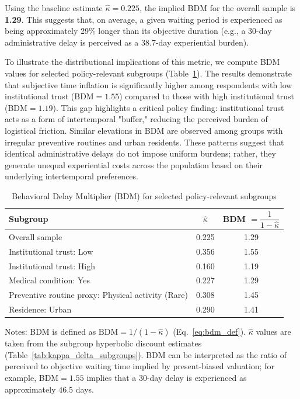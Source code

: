 \documentclass[doublespacing]{utdthesis}
\begin{document}
Using the baseline estimate $\hat{\kappa}=0.225$, the implied BDM for the overall sample is \textbf{1.29}. This suggests that, on average, a given waiting period is experienced as being approximately 29\% longer than its objective duration (e.g., a 30-day administrative delay is perceived as a 38.7-day experiential burden).

To illustrate the distributional implications of this metric, we compute BDM values for selected policy-relevant subgroups (Table~\ref{tab:bdm_selected}). The results demonstrate that subjective time inflation is significantly higher among respondents with low institutional trust (BDM$=1.55$) compared to those with high institutional trust (BDM$=1.19$). This gap highlights a critical policy finding: institutional trust acts as a form of intertemporal "buffer," reducing the perceived burden of logistical friction. Similar elevations in BDM are observed among groups with irregular preventive routines and urban residents. These patterns suggest that identical administrative delays do not impose uniform burdens; rather, they generate unequal experiential costs across the population based on their underlying intertemporal preferences.

\begin{table}[!htbp]
\centering
\caption{Behavioral Delay Multiplier (BDM) for selected policy-relevant subgroups}
\label{tab:bdm_selected}
\begin{threeparttable}
\setlength{\tabcolsep}{7pt}
\begin{tabular}{lcc}
\toprule
Subgroup & $\hat{\kappa}$ & BDM $= \dfrac{1}{1-\hat{\kappa}}$ \\
\midrule
Overall sample & 0.225 & 1.29 \\
\addlinespace
Institutional trust: Low & 0.356 & 1.55 \\
Institutional trust: High & 0.160 & 1.19 \\
\addlinespace
Medical condition: Yes & 0.227 & 1.29 \\
Preventive routine proxy: Physical activity (Rare) & 0.308 & 1.45 \\
Residence: Urban & 0.290 & 1.41 \\
\bottomrule
\end{tabular}
\begin{tablenotes}[flushleft]
\footnotesize
\item Notes: BDM is defined as $\text{BDM}=1/(1-\hat{\kappa})$ (Eq.~\ref{eq:bdm_def}). 
$\hat{\kappa}$ values are taken from the subgroup hyperbolic discount estimates (Table~\ref{tab:kappa_delta_subgroups}). 
BDM can be interpreted as the ratio of perceived to objective waiting time implied by present-biased valuation; for example, BDM$=1.55$ implies that a 30-day delay is experienced as approximately 46.5 days.
\end{tablenotes}
\end{threeparttable}
\end{table}
\end{document}
